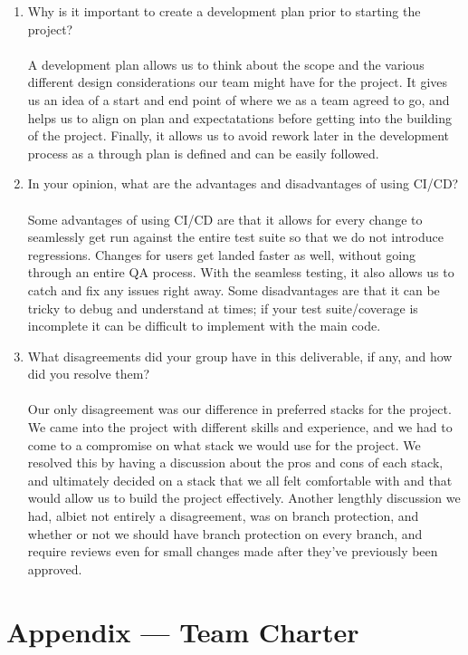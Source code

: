 \documentclass{article}
\begin{document}
\begin{enumerate}
    \item Why is it important to create a development plan prior to starting the
    project? 
    \\\\A development plan allows us to think about the scope and the various different design considerations our team might have for the project.
    It gives us an idea of a start and end point of where we as a team agreed to go, and helps us to align on plan and expectatations before getting into the building of the project.
    Finally, it allows us to avoid rework later in the development process as a through plan is defined and can be easily followed.
    \item In your opinion, what are the advantages and disadvantages of using
    CI/CD? 
    \\\\Some advantages of using CI/CD are that it allows for every change to seamlessly get run against the entire test suite so that we do not introduce regressions. Changes for users get landed faster as well, without going through an entire QA process.
    With the seamless testing, it also allows us to catch and fix any issues right away. Some disadvantages are that it can be tricky to debug and understand at times; if your test suite/coverage is incomplete it can be difficult to implement with the main code.
    \item What disagreements did your group have in this deliverable, if any,
    and how did you resolve them? 
    \\\\Our only disagreement was our difference in preferred stacks for the project. We came into the project with different skills and experience, and we had to come to a compromise on what stack we would use for the project. We resolved this by having a discussion about the pros and cons of each stack, and ultimately decided on a stack that we all felt comfortable with and that would allow us to build the project effectively.
    Another lengthly discussion we had, albiet not entirely a disagreement, was on branch protection, and whether or not we should have branch protection on every branch, and require reviews even for small changes made after they've previously been approved.
\end{enumerate}

\newpage{}

\section*{Appendix --- Team Charter}
\end{document}
